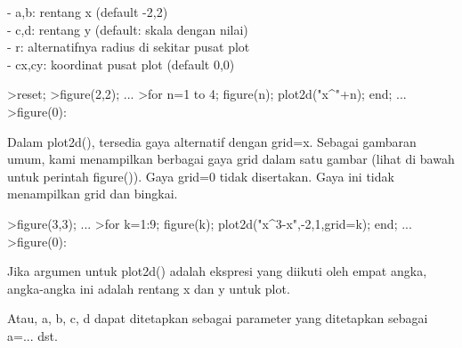 \documentclass[a4paper,10pt]{article}
\begin{document}
\begin{eulernotebook}
\begin{eulercomment}
\begin{eulercomment}
\begin{eulercomment}
\begin{eulercomment}
\begin{eulercomment}
\begin{eulercomment}
\begin{eulercomment}
\begin{eulercomment}
\begin{eulercomment}
\begin{eulercomment}
\begin{eulercomment}
\begin{eulercomment}
\begin{eulercomment}
- a,b: rentang x (default -2,2)\\
- c,d: rentang y (default: skala dengan nilai)\\
- r: alternatifnya radius di sekitar pusat plot\\
- cx,cy: koordinat pusat plot (default 0,0)
\end{eulercomment}
\begin{eulerprompt}
>reset;
>figure(2,2); ...
>for n=1 to 4; figure(n); plot2d("x^"+n); end; ...
>figure(0):
\end{eulerprompt}
\begin{eulercomment}
Dalam plot2d(), tersedia gaya alternatif dengan grid=x. Sebagai
gambaran umum, kami menampilkan berbagai gaya grid dalam satu gambar
(lihat di bawah untuk perintah figure()). Gaya grid=0 tidak
disertakan. Gaya ini tidak menampilkan grid dan bingkai.
\end{eulercomment}
\begin{eulerprompt}
>figure(3,3); ...
>for k=1:9; figure(k); plot2d("x^3-x",-2,1,grid=k); end; ...
>figure(0):
\end{eulerprompt}
\begin{eulercomment}
Jika argumen untuk plot2d() adalah ekspresi yang diikuti oleh empat
angka, angka-angka ini adalah rentang x dan y untuk plot.

Atau, a, b, c, d dapat ditetapkan sebagai parameter yang ditetapkan
sebagai a=... dst.


\end{eulercomment}
\end{eulercomment}
\end{eulercomment}
\end{eulercomment}
\end{eulercomment}
\end{eulercomment}
\end{eulercomment}
\end{eulercomment}
\end{eulercomment}
\end{eulercomment}
\end{eulercomment}
\end{eulercomment}
\end{eulercomment}
\end{eulernotebook}
\end{document}
